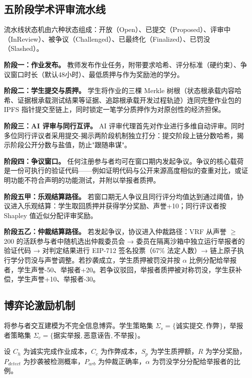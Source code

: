\documentclass[10pt,twocolumn]{ctexart}
\begin{document}
\subsection{五阶段学术评审流水线}

流水线状态机由六种状态组成：开放（Open）、已提交（Proposed）、评审中（InReview）、被争议（Challenged）、已最终化（Finalized）、已罚没（Slashed）。

\textbf{阶段一：作业发布。} 教师发布作业任务，附带要求哈希、评分标准（硬约束）、争议窗口时长（默认48小时）、最低质押与作为奖励池的学分。

\textbf{阶段二：学生提交与质押。} 学生将作业的三棵 Merkle 树根（状态根承载内容哈希、证据根承载测试结果等证据、追踪根承载开发过程轨迹）连同完整作业包的 IPFS 指针提交至链上，同时锁定一笔学分质押作为对原创性的经济担保。

\textbf{阶段三：AI 评审与同行互评。} AI 评审代理首先对作业进行多维自动评审。同时多位同行评议者采用提交-揭示两阶段机制独立打分：提交阶段上链分数哈希，揭示阶段公开分数与盐值，防止"跟随串谋"。

\textbf{阶段四：争议窗口。} 任何注册参与者均可在窗口期内发起争议。争议的核心载荷是一份可执行的验证代码——例如证明代码与公开来源高度相似的查重对比，或证明功能不符合声明的功能测试，并附以举报者质押。

\textbf{阶段五甲：乐观结算路径。} 若窗口期无人争议且同行评分均值达到通过阈值，协议进入乐观结算：学生取回质押并获得学分奖励、声誉+10；同行评议者按 Shapley 值近似分配评审奖励。

\textbf{阶段五乙：仲裁结算路径。} 若发起争议，协议进入仲裁路径：VRF 从声誉 $\geq$ 200 的活跃参与者中随机选出仲裁委员会 → 委员在隔离沙箱中独立运行举报者的验证代码 → 对判定结果进行 EIP-712 签名投票（67\% 法定人数）→ 链上原子执行学分罚没与声誉调整。若抄袭成立，学生质押被罚没并按 $\alpha$ 比例分配给举报者，学生声誉-50、举报者+20。若争议驳回，举报者质押被对称罚没，学生获补偿，学生声誉+10、举报者-30。

\subsection{博弈论激励机制}

将参与者交互建模为不完全信息博弈。学生策略集 $\Sigma_s = \{\text{诚实提交}, \text{作弊}\}$，举报者策略集 $\Sigma_c = \{\text{据实举报}, \text{恶意诬告}, \text{不举报}\}$。

设 $C_h$ 为诚实完成作业成本，$C_c$ 为作弊成本，$S_p$ 为学生质押额，$R$ 为学分奖励，$P_{detect}$ 为抄袭被检测概率，$P_{arb}$ 为仲裁正确率，$\alpha$ 为罚没学分分配给举报者的比例。
\end{document}
